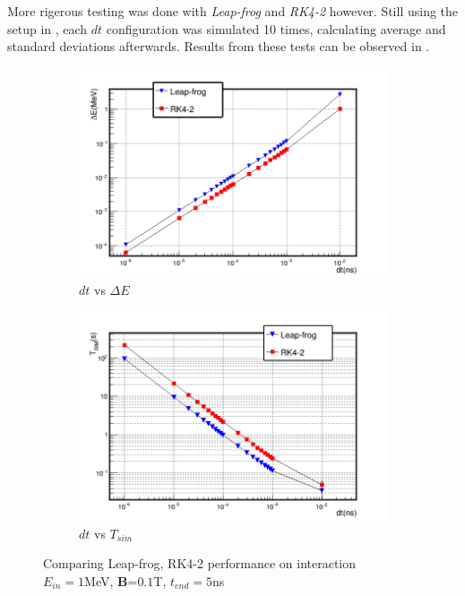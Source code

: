 \documentclass{book}
\begin{document}
More rigerous testing was done with \textit{Leap-frog} and \textit{RK4-2} however. 
Still using the setup in , each $dt$ configuration was simulated 10 times, calculating average and standard deviations afterwards.
Results from these tests can be observed in .
\begin{figure}
    \captionsetup[subfigure]{justification=centering}
    \captionsetup{justification=centering}
    \centering
    \begin{subfigure}{0.8\textwidth}
        \centering
        \includegraphics[width=\linewidth]{../../../figures/analiz/mag_lf_rk2_dt-E.png}
        \caption*{$dt$ vs $\Delta E$}
    \end{subfigure}
    
    \begin{subfigure}{0.8\textwidth}
        \centering
        \includegraphics[width=\linewidth]{../../../figures/analiz/mag_lf_rk2_dt-Tsim.png}
        \caption*{$dt$ vs $T_{sim}$}
    \end{subfigure}
    \caption{Comparing Leap-frog, RK4-2 performance on \eB interaction\\ $E_{in}=1$MeV, \textbf{B}=$0.1$T, $t_{end}=5$ns}
    \label{fig:mag_lf_rk2_comparison}
\end{figure}
\end{document}
